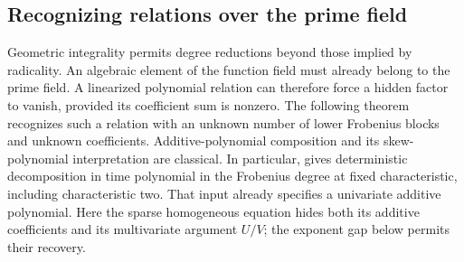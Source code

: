 \subsection{Recognizing relations over the prime field}
Geometric integrality permits degree reductions beyond those implied
by radicality. An algebraic element of the function field must already
belong to the prime field. A linearized polynomial relation can
therefore force a hidden factor to vanish, provided its coefficient
sum is nonzero. The following theorem recognizes such a relation with
an unknown number of lower Frobenius blocks and unknown coefficients.
Additive-polynomial composition and its skew-polynomial interpretation
are classical. In particular, \citet[\S6, Theorem~6.1, pp.~22--24 of
the author version]{sp-giesbrecht} gives deterministic decomposition
in time polynomial in the Frobenius degree at fixed characteristic,
including characteristic two. That input already specifies a
univariate additive polynomial. Here the sparse homogeneous equation
hides both its additive coefficients and its multivariate argument
$U/V$; the exponent gap below permits their recovery.

